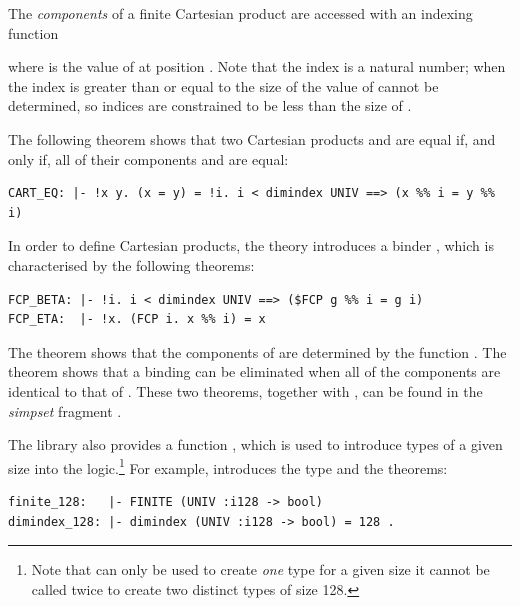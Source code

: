 {The \emph{components} of a finite Cartesian product are accessed with an 
indexing function
where  is the value of  at position .  Note that 
the index  is a natural number; when the index is greater than or 
equal to the size of  the value of  cannot be determined, so 
indices are constrained to be less than the size of .

The following theorem shows that two Cartesian products  and 
 are equal if, and only if, all of their components  and 
 are equal:  
\begin{hol}
\begin{verbatim}
CART_EQ: |- !x y. (x = y) = !i. i < dimindex UNIV ==> (x %% i = y %% i)
\end{verbatim}
\end{hol}

In order to define Cartesian products, the theory  introduces a 
binder , which is characterised by the following theorems:
\begin{hol}
\begin{verbatim}
FCP_BETA: |- !i. i < dimindex UNIV ==> ($FCP g %% i = g i)
FCP_ETA:  |- !x. (FCP i. x %% i) = x
\end{verbatim}
\end{hol}
The theorem  shows that the components of  are 
determined by the function .  The theorem 
 shows that a binding can be eliminated when all of the components 
are identical to that of .
These two theorems, together with , can be found in the 
\emph{simpset} fragment .

The library  also provides a function , 
which is used to introduce types of a given size into the logic.\footnote{Note 
that   can only be used to create \emph{one} type for a given 
size \ie{} it cannot be called twice to create two distinct types of size 128.} 
 For example,  introduces the type  and the 
theorems:
\begin{hol}
\begin{verbatim}
finite_128:   |- FINITE (UNIV :i128 -> bool)
dimindex_128: |- dimindex (UNIV :i128 -> bool) = 128 .
\end{verbatim}
\end{hol}

}
